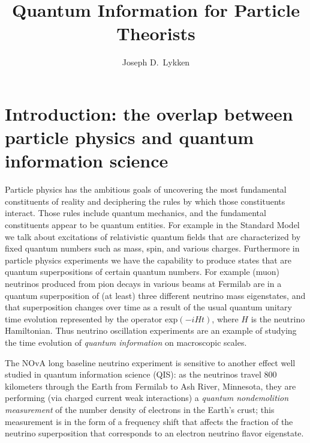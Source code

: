 \documentclass[a4paper,11pt]{article}
\title{Quantum Information for Particle Theorists}
\author{Joseph D.~Lykken}
\affiliation{Fermilab Quantum Institute
and Theoretical Physics Department,\\ 
Fermi National Accelerator Laboratory\\
Batavia, IL 60510, USA}
\begin{document}
\maketitle

\section{Introduction: the overlap between particle physics and quantum information science}\label{sec:one}

Particle physics has the ambitious goals of uncovering the most fundamental constituents of reality and deciphering the rules by which
those constituents interact. Those rules include quantum mechanics, and the fundamental constituents appear to be quantum entities.
For example in the Standard Model we talk about excitations of relativistic quantum fields that are characterized by fixed quantum numbers such as
mass, spin, and various charges. Furthermore in particle physics experiments we have the capability to produce states that are quantum
superpositions of certain quantum numbers. For example (muon) neutrinos produced from pion decays in various beams at Fermilab are in
a quantum superposition of (at least) three different neutrino mass eigenstates, and that superposition changes over time as a result of the
usual quantum unitary time evolution represented by the operator exp$(-iHt)$, where $H$ is the neutrino Hamiltonian.
Thus neutrino oscillation experiments are an example of studying the time evolution of {\it quantum information} on macroscopic scales.

The NOvA long baseline neutrino experiment is sensitive to another effect well studied in quantum information science (QIS): as the neutrinos
travel 800 kilometers through the Earth from Fermilab to Ash River, Minnesota, they are performing (via charged current weak interactions) a
{\it quantum nondemolition measurement} of the number density of electrons in the Earth's crust; this measurement is in the form of 
a frequency shift that affects the fraction of the neutrino superposition that corresponds to an electron neutrino flavor
eigenstate. 
\end{document}
